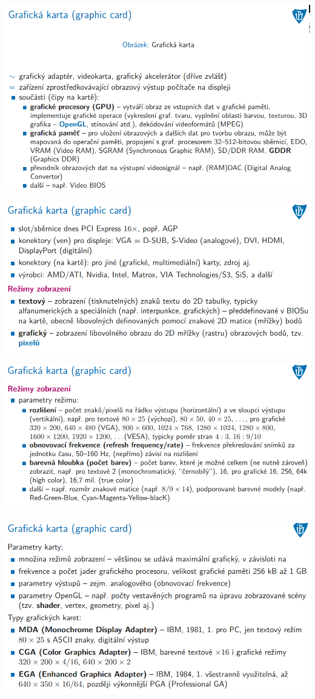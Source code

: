 \documentclass[10pt,a4paper]{article}
\begin{document}
\includegraphics[scale=0.65]{img/prvni_odstavec/otazka7/karty2.png}

\includegraphics[scale=0.65]{img/prvni_odstavec/otazka7/karty3.png}

\includegraphics[scale=0.65]{img/prvni_odstavec/otazka7/karty4.png}

\includegraphics[scale=0.65]{img/prvni_odstavec/otazka7/karty5.png}
\end{document}
